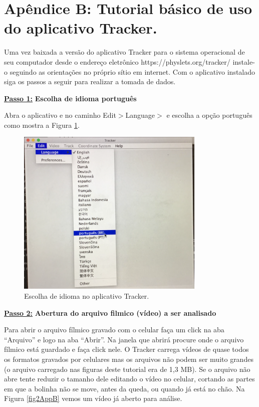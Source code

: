 \documentclass[12pt]{article}
\begin{document}
\section{Apêndice B: Tutorial básico de uso do aplicativo Tracker.}
\label{ApendiceB}
\indent

Uma vez baixada a versão do aplicativo Tracker para o sistema operacional de seu computador 
desde o endereço eletrônico  {\color{blue} https://physlets.org/tracker/} instale-o seguindo as orientações no próprio sítio em internet. Com o aplicativo instalado siga os passos a seguir para realizar a tomada de dados.


\underline{\bf Passo 1:} {\bf Escolha de idioma português}\\
\indent 

Abra o aplicativo e no caminho Edit$>$Language$>$ e escolha a opção português como mostra a Figura \ref{fig1AppB}.

\begin{figure}[h!]
\includegraphics[width=9cm]{fig1AppB.pdf}
\caption{Escolha de idioma no aplicativo Tracker.}
\label{fig1AppB}
\end{figure}

\underline{\bf Passo 2:} {\bf Abertura do arquivo filmico (vídeo) a ser analisado}\\
\indent 

Para abrir o arquivo fílmico gravado com o celular faça um click na aba
``Arquivo'' e logo na aba ``Abrir''. Na janela que abrirá procure onde o arquivo fílmico 
está guardado e faça click nele. O Tracker carrega vídeos de quase todos os formatos gravados 
por celulares mas os arquivos não podem ser muito grandes (o arquivo carregado nas figuras 
deste tutorial era de 1,3 MB). Se o arquivo não abre tente reduzir o tamanho dele editando 
o vídeo no celular, cortando as partes em que a bolinha não se move, antes da queda, ou quando
já está no chão.
Na Figura \ref{fig2AppB} vemos um vídeo já aberto para análise.
\end{document}
